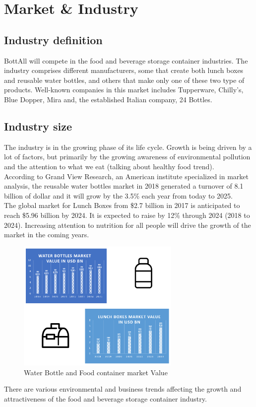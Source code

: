 \section{Market \& Industry}
\subsection{Industry definition} 
BottAll will compete in the food and beverage storage container industries. The industry comprises different manufacturers, some that create both lunch boxes and reusable water bottles, and others that make only one of these two type of products. Well-known companies in this market includes Tupperware, Chilly’s, Blue Dopper, Mira and, the established Italian company, 24 Bottles. 

\subsection{Industry size} 
The industry is in the growing phase of its life cycle. Growth is being driven by a lot of factors, but primarily by the growing awareness of environmental pollution and the attention to what we eat (talking about healthy food trend).\\
According to Grand View Research, an American institute specialized in market analysis, the reusable water bottles market in 2018 generated a turnover of 8.1 billion of dollar and it will grow by the 3.5\% each year from today to 2025. \\
The global market for Lunch Boxes from \$2.7 billion in 2017 is anticipated to reach \$5.96 billion by 2024. It is expected to raise by 12\% through 2024 (2018 to 2024). Increasing attention to nutrition for all people will drive the growth of the market in the coming years.
\begin{figure}[H]
\centering
\includegraphics[width=0.7\textwidth]{images/bottle_lunch_market.PNG}
\caption{Water Bottle and Food container market Value}
\end{figure}
There are various environmental and business trends affecting the growth and attractiveness of the food and beverage storage container industry.

